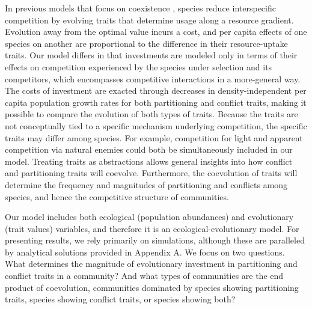 In previous models that focus on coexistence \citep[e.g.,][]{Pastore2021, 
Taper1992}, species reduce interspecific competition by evolving
traits that determine usage along a resource gradient. Evolution away
from the optimal value incurs a cost, and per capita effects of one
species on another are proportional to the difference in their
resource-uptake traits. Our model differs in that investments are
modeled only in terms of their effects on competition experienced by the
species under selection and its competitors, which encompasses
competitive interactions in a more-general way. The costs of investment
are exacted through decreases in density-independent per capita
population growth rates for both partitioning and conflict traits,
making it possible to compare the evolution of both types of traits.
Because the traits are not conceptually tied to a specific mechanism
underlying competition, the specific traits may differ among species.
For example, competition for light and apparent competition via natural
enemies could both be simultaneously included in our model. Treating
traits as abstractions allows general insights into how conflict and
partitioning traits will coevolve. Furthermore, the coevolution of
traits will determine the frequency and magnitudes of partitioning and
conflicts among species, and hence the competitive structure of
communities.

Our model includes both ecological (population abundances) and
evolutionary (trait values) variables, and therefore it is an
ecological-evolutionary model. For presenting results, we rely primarily
on simulations, although these are paralleled by analytical solutions
provided in Appendix A. We focus on two questions. What determines the
magnitude of evolutionary investment in partitioning and conflict traits
in a community? And what types of communities are the end product of
coevolution, communities dominated by species showing partitioning
traits, species showing conflict traits, or species showing both?

